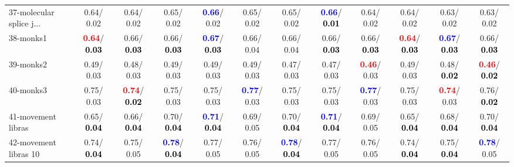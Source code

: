 \begin{table}[h]
\begin{center}
{\begin{tabular}{lc|c|c|c|c|c|c|c|c|c|c}
37-molecular splice j... &   0.64/  0.02 &   0.64/  0.02 &   0.65/  0.02 & \textcolor{blue}{\textbf{  0.66}}/  0.02 &   0.65/  0.02 &   0.65/  0.02 & \textcolor{blue}{\textbf{  0.66}}/\textcolor{black}{\textbf{  0.01}} &   0.64/  0.02 &   0.64/  0.02 &   0.63/  0.02 &   0.63/  0.02 \\
38-monks1 & \textcolor{red}{\textbf{  0.64}}/\textcolor{black}{\textbf{  0.03}} &   0.66/\textcolor{black}{\textbf{  0.03}} &   0.66/\textcolor{black}{\textbf{  0.03}} & \textcolor{blue}{\textbf{  0.67}}/\textcolor{black}{\textbf{  0.03}} &   0.66/  0.04 &   0.66/  0.04 &   0.66/\textcolor{black}{\textbf{  0.03}} &   0.66/\textcolor{black}{\textbf{  0.03}} & \textcolor{red}{\textbf{  0.64}}/\textcolor{black}{\textbf{  0.03}} & \textcolor{blue}{\textbf{  0.67}}/\textcolor{black}{\textbf{  0.03}} &   0.66/\textcolor{black}{\textbf{  0.03}} \\
39-monks2 &   0.49/  0.03 &   0.48/  0.03 &   0.49/  0.03 &   0.49/  0.03 &   0.49/  0.03 &   0.47/  0.03 &   0.47/  0.03 & \textcolor{red}{\textbf{  0.46}}/  0.03 &   0.49/  0.03 &   0.48/\textcolor{black}{\textbf{  0.02}} & \textcolor{red}{\textbf{  0.46}}/\textcolor{black}{\textbf{  0.02}} \\ \hline
40-monks3 &   0.75/  0.03 & \textcolor{red}{\textbf{  0.74}}/\textcolor{black}{\textbf{  0.02}} &   0.75/  0.03 &   0.75/  0.03 & \textcolor{blue}{\textbf{  0.77}}/  0.03 &   0.75/  0.03 &   0.75/  0.03 & \textcolor{blue}{\textbf{  0.77}}/  0.03 &   0.75/  0.03 & \textcolor{red}{\textbf{  0.74}}/  0.03 &   0.76/\textcolor{black}{\textbf{  0.02}} \\
41-movement libras &   0.65/\textcolor{black}{\textbf{  0.04}} &   0.66/\textcolor{black}{\textbf{  0.04}} &   0.70/\textcolor{black}{\textbf{  0.04}} & \textcolor{blue}{\textbf{  0.71}}/\textcolor{black}{\textbf{  0.04}} &   0.69/  0.05 &   0.70/\textcolor{black}{\textbf{  0.04}} & \textcolor{blue}{\textbf{  0.71}}/\textcolor{black}{\textbf{  0.04}} &   0.69/  0.05 &   0.65/\textcolor{black}{\textbf{  0.04}} &   0.68/\textcolor{black}{\textbf{  0.04}} &   0.70/\textcolor{black}{\textbf{  0.04}} \\
42-movement libras 10 &   0.74/\textcolor{black}{\textbf{  0.04}} &   0.75/  0.05 & \textcolor{blue}{\textbf{  0.78}}/\textcolor{black}{\textbf{  0.04}} &   0.77/  0.05 &   0.76/  0.05 & \textcolor{blue}{\textbf{  0.78}}/\textcolor{black}{\textbf{  0.04}} &   0.77/  0.05 &   0.76/  0.05 &   0.74/\textcolor{black}{\textbf{  0.04}} &   0.75/\textcolor{black}{\textbf{  0.04}} & \textcolor{blue}{\textbf{  0.78}}/  0.05 \\

\end{tabular}}
\end{center}
\end{table}
